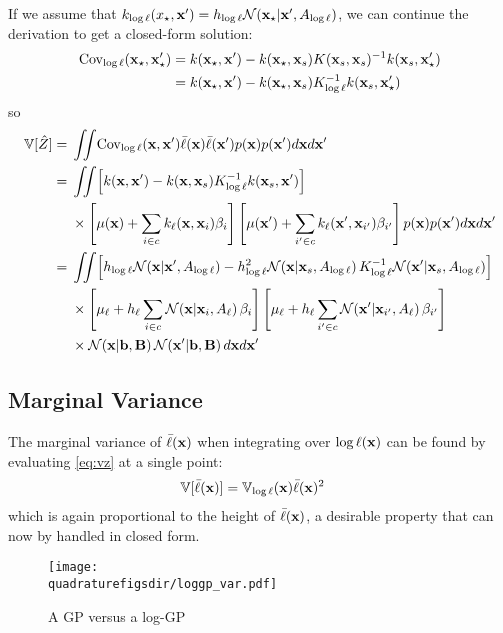 If we assume that $k_{\log \ell}(x_\star, {\bf{x}}') = h_{\log \ell}\mathcal{N}\!\left({\bf{x}}_\star \middle| {\bf{x}}',A_{\log \ell}\right)$, we can continue the derivation to get a closed-form solution:
\begin{align}
\textrm{Cov}_{{\log \ell}}({\bf{x}}_\star, {\bf{x}}_\star') & = k( {\bf{x}}_\star, {\bf{x}}' ) - k( {\bf{x}}_\star, {\bf{x}}_s ) K({\bf{x}}_s, {\bf{x}}_s)^{-1} k( {\bf{x}}_s, {\bf{x}}_\star' ) \\
& = k( {\bf{x}}_\star, {\bf{x}}' ) - k( {\bf{x}}_\star, {\bf{x}}_s ) K_{{\log \ell}}^{-1} k( {\bf{x}}_s, {\bf{x}}_\star' )
\end{align}
so
\begin{align}
\var[\hat Z] = {} & \int\!\!\! \int\! \textrm{Cov}_{\lftwo}(\vx, \vx') \mftwo(\vx) \mftwo(\vx') p(\vx) p(\vx') d\vx d\vx' \\
= {} & \int\!\!\! \int\! \left[k( \vx, \vx' ) - k( \vx, \vx_s ) K_{\lftwo}^{-1} k( \vx_s, \vx' ) \right] \\ 
& \times \left[\mu(\vx) + \sum_{i \in c} k_\ell(\vx, \vx_i) \beta_i \right] \left[\mu(\vx') + \sum_{i' \in c} k_\ell(\vx', \vx_{i'}) \beta_{i'} \right] p(\vx) p(\vx') d\vx d\vx' \\
= {} & \int\!\!\! \int\! \left[ h_\lftwo \N{\vx}{\vx'}{A_\lftwo} - h_\lftwo^2 \N{\vx}{\vx_s}{A_\lftwo} K_{\lftwo}^{-1} \N{\vx'}{\vx_s}{A_\lftwo} \right] \\ 
& \times \left[\mu_\ell + h_\ell \sum_{i \in c} \N{\vx}{\vx_i}{A_\ell} \beta_i \right] \left[\mu_\ell + h_\ell \sum_{i' \in c} \N{\vx'}{\vx_{i'}}{A_\ell} \beta_{i'} \right] \\
& \times \N{\vx}{\vb}{\vB} \N{\vx'}{\vb}{\vB} d\vx d\vx'
\end{align}


\subsection{Marginal Variance}

The marginal variance of ${\bar \ell}({\bf{x}})$ when integrating over ${\log \ell}({\bf{x}})$ can be found by evaluating \eqref{eq:vz} at a single point:
%
\begin{align}
\mathbb{V}[{\bar \ell}({\bf{x}})] & = \mathbb{V}_{\log \ell}({\bf{x}}) {\bar \ell}({\bf{x}})^2
\label{eq:vz}
\end{align}
%
which is again proportional to the height of ${\bar \ell}({\bf{x}})$, a desirable property that can now by handled in closed form.

\begin{figure}
\centering
\texttt{[image: \\quadraturefigsdir/loggp\_var.pdf]}
\caption{A GP versus a log-GP}
\label{fig:loggp}
\end{figure}




